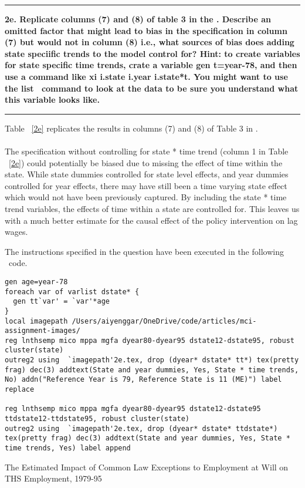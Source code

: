 \documentclass[12pt]{article}
\newcommand\question[1]{\vspace{1em}\hrule\vspace{1em}\textbf{#1}\vspace{1em}\hrule\vspace{1em}}
\begin{document}
\newpage
\question{2e. Replicate columns (7) and (8) of table 3 in the \cite{Autor2003}. Describe an omitted factor that might lead to bias in the specification in column (7) but would not in column (8) i.e., what sources of bias does adding state speciific trends to the model control for? Hint: to create variables for state specific time trends, crate a variable gen t=year-78, and then use a command like xi i.state i.year i.state*t. You might want to use the \textquotesingle list \textquotesingle \ command to look at the data to be sure you understand what this variable looks like. }

\noindent Table ~\ref{2e} replicates the results in columns (7) and (8) of Table 3 in \cite{Autor2003}. \\\\The specification without controlling for state * time trend (column 1 in Table ~\ref{2e}) could potentially be biased due to missing the effect of time within the state. While state dummies controlled for state level effects, and year dummies controlled for year effects, there may have still been a time varying state effect which would not have been previously captured. By including the state * time trend variables, the effects of time within a state are controlled for. This leaves us with a much better estimate for the causal effect of the policy intervention on lag wages.
 
The instructions specified in the question have been executed in the following \stata \  code.\\
\begin{lstlisting}
gen age=year-78
foreach var of varlist dstate* {
  gen tt`var' = `var'*age
}
local imagepath /Users/aiyenggar/OneDrive/code/articles/mci-assignment-images/
reg lnthsemp mico mppa mgfa dyear80-dyear95 dstate12-dstate95, robust cluster(state)
outreg2 using  `imagepath'2e.tex, drop (dyear* dstate* tt*) tex(pretty frag) dec(3) addtext(State and year dummies, Yes, State * time trends, No) addn("Reference Year is 79, Reference State is 11 (ME)") label replace

reg lnthsemp mico mppa mgfa dyear80-dyear95 dstate12-dstate95 ttdstate12-ttdstate95, robust cluster(state)
outreg2 using  `imagepath'2e.tex, drop (dyear* dstate* ttdstate*) tex(pretty frag) dec(3) addtext(State and year dummies, Yes, State * time trends, Yes) label append
\end{lstlisting}

\begin{table}
\caption{The Estimated Impact of Common Law Exceptions to Employment at Will on THS Employment, 1979-95}

\label{2e}
\end{table}
\end{document}

